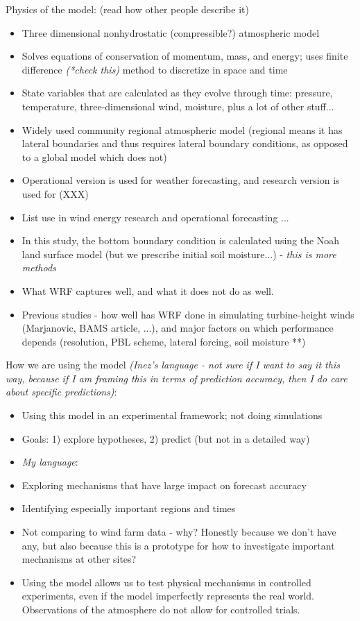 \documentclass[12pt]{amsart}
\begin{document}
Physics of the model: (read how other people describe it)
\begin{itemize}
\item Three dimensional nonhydrostatic (compressible?) atmospheric model
\item Solves equations of conservation of momentum, mass, and energy; uses finite difference \textit{(*check this)} method to discretize in space and time
\item State variables that are calculated as they evolve through time: pressure, temperature, three-dimensional wind, moisture, plus a lot of other stuff...
\item Widely used community regional atmospheric model (regional means it has lateral boundaries and thus requires lateral boundary conditions, as opposed to a global model which does not)
\item Operational version is used for weather forecasting, and research version is used for (XXX)
\item List use in wind energy research and operational forecasting ...
\item In this study, the bottom boundary condition is calculated using the Noah land surface model (but we prescribe initial soil moisture...) - \textit{this is more methods}
\item What WRF captures well, and what it does not do as well.
\item Previous studies - how well has WRF done in simulating turbine-height winds (Marjanovic, BAMS article, ...), and major factors on which performance depends (resolution, PBL scheme, lateral forcing, soil moisture **)
\end{itemize}

How we are using the model \textit{(Inez's language - not sure if I want to say it this way, because if I am framing this in terms of prediction accuracy, then I do care about specific predictions)}:
\begin{itemize}
\item Using this model in an experimental framework; not doing simulations
\item Goals: 1) explore hypotheses, 2) predict (but not in a detailed way)
\item \textit{My language}:
\item Exploring mechanisms that have large impact on forecast accuracy
\item Identifying especially important regions and times
\item Not comparing to wind farm data - why? Honestly because we don't have any, but also because this is a prototype for how to investigate important mechanisms at other sites?
\item Using the model allows us to test physical mechanisms in controlled experiments, even if the model imperfectly represents the real world.  Observations of the atmosphere do not allow for controlled trials.
\end{itemize}
\end{document}
